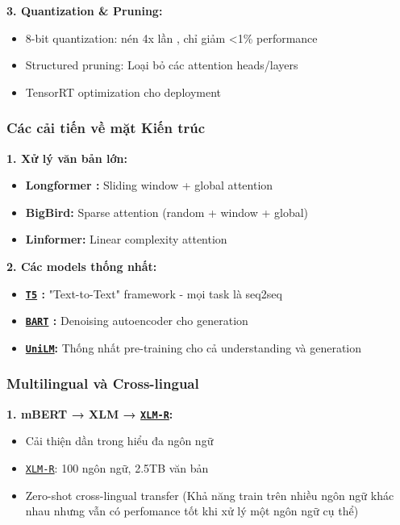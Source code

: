 \textbf{3. Quantization \& Pruning:}
\begin{itemize}
    \item 8-bit quantization: nén 4x lần , chỉ giảm <1\% performance 
    \item Structured pruning: Loại bỏ các attention heads/layers
    \item TensorRT optimization cho deployment
\end{itemize}

\subsubsection{Các cải tiến về mặt Kiến trúc}

\textbf{1. Xử lý văn bản lớn:}
\begin{itemize}
    \item \textbf{Longformer \cite{beltagy2020longformer}:} Sliding window + global attention
    \item \textbf{BigBird:} Sparse attention (random + window + global)
    \item \textbf{Linformer:} Linear complexity attention
\end{itemize}

\textbf{2. Các models thống nhất:}
\begin{itemize}
    \item \textbf{\hyperref[acro:t5]{\texttt{T5}} \cite{raffel2020exploring}:} "Text-to-Text" framework - mọi task là seq2seq
    \item \textbf{\hyperref[acro:bart]{\texttt{BART}} \cite{lewis2019bart}:} Denoising autoencoder cho generation
    \item \textbf{\hyperref[acro:unilm]{\texttt{UniLM}}:} Thống nhất pre-training cho cả understanding và generation
\end{itemize}

\subsubsection{Multilingual và Cross-lingual}

\textbf{1. mBERT → XLM \cite{conneau2019unsupervised} → \hyperref[acro:xlm-r]{\texttt{XLM-R}}:}
\begin{itemize}
    \item Cải thiện dần trong hiểu đa ngôn ngữ
    \item \hyperref[acro:xlm-r]{\texttt{XLM-R}}: 100 ngôn ngữ, 2.5TB văn bản
    \item Zero-shot cross-lingual transfer (Khả năng train trên nhiều ngôn ngữ khác nhau nhưng vẫn có perfomance tốt khi xử lý một ngôn ngữ cụ thể) 
\end{itemize}

